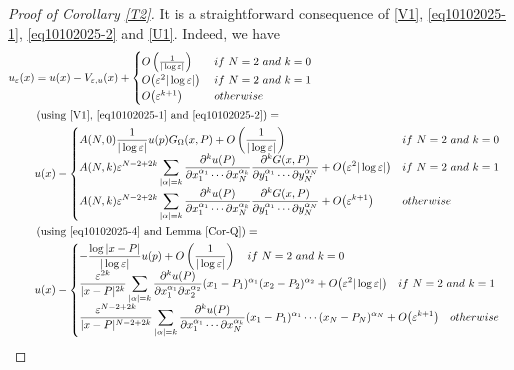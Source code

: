 \documentclass[11pt,reqno]{article}
\numberwithin{equation}{section}
\newcommand\e\varepsilon
\begin{document}
\begin{proof}[Proof of Corollary \ref{T2}]
		It is a straightforward consequence of \eqref{V1}, \eqref{eq10102025-1}, \eqref{eq10102025-2} and \eqref{U1}. Indeed, we have
			\begin{align*}
				u_\e(x)&=u(x)-V_{\e,u}(x)+ 	\begin{cases}
                O\left(\frac{1}{|\log\e|}\right)\quad& if  \ N=2  \ and\ k=0\\
                O\big(\e^2|\log\e|\big) & if  \ N=2  \ and\ k=1\\
                O\big(\e^{k+1}\big) & otherwise\\
            \end{cases}\\
            &\left(\hbox{using \eqref{V1}, \eqref{eq10102025-1} and \eqref{eq10102025-2}}\right)=\\
            &u(x)-\begin{cases}
              \displaystyle A(N,0)\frac{1}{|\log \e|}u(p)G_\Omega(x,P)+ O\left(\frac{1}{|\log\e|}\right)\quad& if  \ N=2  \ and\ k=0\\
            \displaystyle A(N,k)\e^{N-2+2k}\sum_{|\alpha|=k}\frac{\partial^ku(P)}{\partial x_1^{\alpha_1}\cdots\partial x_N^{\alpha_k}}  \frac{\partial^kG(x,P)}{\partial y_1^{\alpha_1}\cdots\partial y_N^{\alpha_N}} +O\big(\e^2|\log\e|\big) & if  \ N=2  \ and\ k=1\\
             \displaystyle   A(N,k)\e^{N-2+2k}\sum_{|\alpha|=k}\frac{\partial^ku(P)}{\partial x_1^{\alpha_1}\cdots\partial x_N^{\alpha_k}}  \frac{\partial^kG(x,P)}{\partial y_1^{\alpha_1}\cdots\partial y_N^{\alpha_N}} + O\big(\e^{k+1}\big) & otherwise\\
            \end{cases}\\
            &\left(\hbox{using \eqref{eq10102025-4} and Lemma \ref{Cor-Q}}\right)=\\
             &u(x)-\begin{cases}
              \displaystyle -\frac{\log|x-P|}{|\log \e|}u(p)+ O\left(\frac{1}{|\log\e|}\right)\quad  if  \ N=2  \ and\ k=0\\
            \displaystyle \frac{\e^{2k}}{|x-P|^{2k}}\sum_{|\alpha|=k}\frac{\partial^ku(P)}{\partial x_1^{\alpha_1}\partial x_2^{\alpha_2}}  (x_1-P_1)^{\alpha_1}(x_2-P_2)^{\alpha_2} +O\big(\e^2|\log\e|\big) \quad  if  \ N=2  \ and\ k=1\\
             \displaystyle   \frac{\e^{N-2+2k}}{|x-P|^{N-2+2k}}\sum_{|\alpha|=k}\frac{\partial^ku(P)}{\partial x_1^{\alpha_1}\cdots\partial x_N^{\alpha_k}}  (x_1-P_1)^{\alpha_1}\cdots(x_N-P_N)^{\alpha_N} + O\big(\e^{k+1}\big) \quad  otherwise\\

\end{cases}
\end{align*}
\end{proof}
\end{document}
